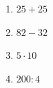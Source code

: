 %
%
    \begin{enumerate}
        \item $25 + 25$
        \item $82 - 32$
        \item $5 \cdot 10$
        \item $200 : 4$
    \end{enumerate}
